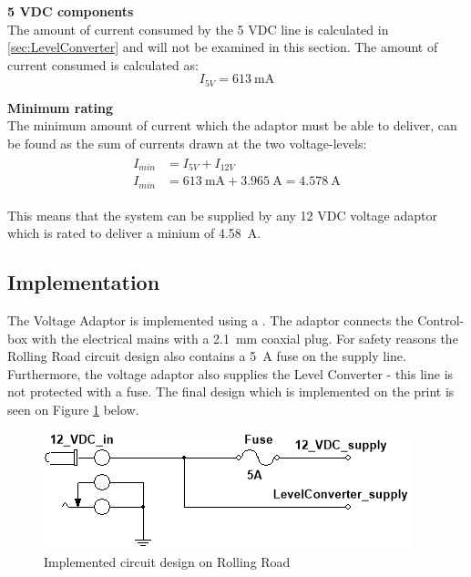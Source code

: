 \textbf{5 VDC components}\\
The amount of current consumed by the 5 VDC line is calculated in \vref{sec:LevelConverter} and will not be examined in this section. The amount of current consumed is calculated as:
\begin{equation}
	I_{5V} = \SI{613}{\milli \ampere}
\end{equation}

\textbf{Minimum rating}\\
The minimum amount of current which the adaptor must be able to deliver, can be found as the sum of currents drawn at the two voltage-levels:
\begin{align}
	\begin{split}
		I_{min} &= I_{5V} + I_{12V}\\
		I_{min} &= \SI{613}{\milli \ampere} + \SI{3.965}{\ampere} = \SI{4.578}{\ampere}
	\end{split}
\end{align}

This means that the system can be supplied by any 12 VDC voltage adaptor which is rated to deliver a minium of \SI{4.58}{\ampere}.

\subsection{Implementation}
The Voltage Adaptor is implemented  using a . The adaptor connects the Control-box with the electrical mains with a \SI{2.1}{\milli \meter} coaxial plug. For safety reasons the Rolling Road circuit design also contains a \SI{5}{\ampere} fuse on the supply line. Furthermore, the voltage adaptor also supplies the Level Converter - this line is not protected with a fuse. The final design which is implemented on the print is seen on Figure \ref{fig:DesignVoltageAdaptor} below.

\begin{figure}[H]
	\centering
	\includegraphics[width=0.5\linewidth]{Hardware/Pictures/DesignVoltageAdaptor}
	\caption{Implemented circuit design on Rolling Road}
	\label{fig:DesignVoltageAdaptor}
\end{figure}

